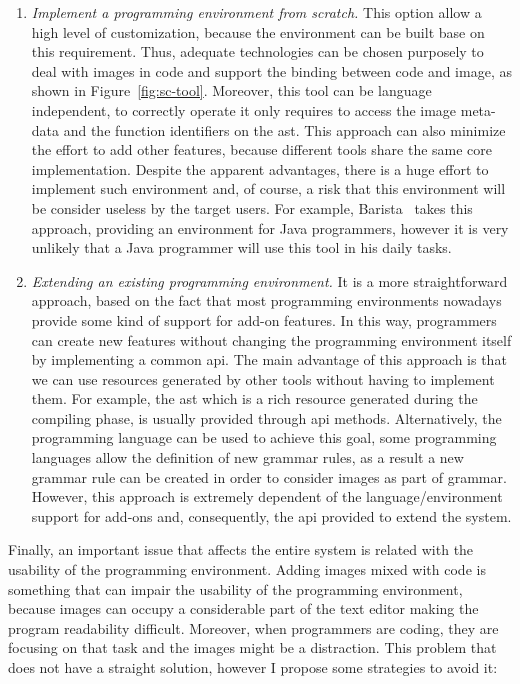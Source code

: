 \begin{enumerate}
\item \textit{Implement a programming environment from scratch.} This option allow a high level of customization, because the environment can be built base on this requirement. Thus, adequate technologies can be chosen purposely to deal with images in code and support the binding between code and image, as shown in Figure~\ref{fig:sc-tool}. Moreover, this tool can be language independent, to correctly operate it only requires to access the image meta-data and the function identifiers on the \gls{ast}. This approach can also minimize the effort to add other features, because different tools share the same core implementation. Despite the apparent advantages, there is a huge effort to implement such environment and, of course, a risk that this environment will be consider useless by the target users. For example, Barista~\citep{ko2006barista} takes this approach, providing an environment for Java programmers, however it is very unlikely that a Java programmer will use this tool in his daily tasks.

\item \textit{Extending an existing programming environment.} It is a more straightforward approach, based on the fact that most programming environments nowadays provide some kind of support for add-on features. In this way, programmers can create new features without changing the programming environment itself by implementing a common \gls{api}. The main advantage of this approach is that we can use resources generated by other tools without having to implement them. For example, the \gls{ast} which is a rich resource generated during the compiling phase, is usually provided through \gls{api} methods. Alternatively, the programming language can be used to achieve this goal, some programming languages allow the definition of new grammar rules, as a result a new grammar rule can be created in order to consider images as part of grammar. However, this approach is extremely dependent of the language/environment support for add-ons and, consequently, the \gls{api} provided to extend the system.
\end{enumerate}

Finally, an important issue that affects the entire system is related with the usability of the programming environment. Adding images mixed with code is something that can impair the usability of the programming environment, because images can occupy a considerable part of the text editor making the program readability difficult. Moreover, when programmers are coding, they are focusing on that task and the images might be a distraction. This problem that does not have a straight solution, however I propose some strategies to avoid it:

